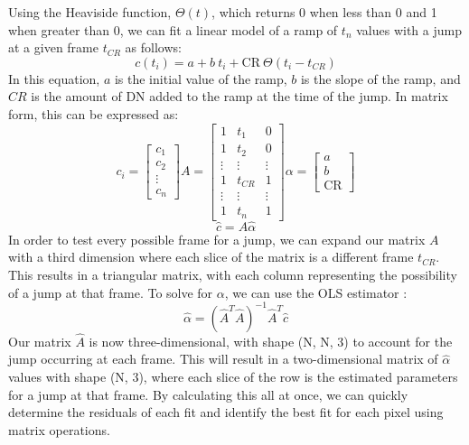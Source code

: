 Using the Heaviside function, $\Theta(t)$, which returns 0 when less than 0 and 1 when greater than 0, we can fit a linear model of a ramp of $t_n$ values with a jump at a given frame $t_{CR}$ as follows:
\begin{equation}
    c(t_i) = a + b\ t_i + \text{CR}\ \Theta(t_i - t_{CR})
\end{equation}
In this equation, $a$ is the initial value of the ramp, $b$ is the slope of the ramp, and $CR$ is the amount of DN added to the ramp at the time of the jump.
In matrix form, this can be expressed as:
\begin{equation}
    c_i = \begin{bmatrix}
        c_1 \\
        c_2 \\
        \vdots \\
        c_n
    \end{bmatrix}
    A = \begin{bmatrix}
        1 & t_1 & 0 \\
        1 & t_2 & 0 \\
        \vdots & \vdots & \vdots \\
        1 & t_{CR} & 1 \\
        \vdots & \vdots & \vdots \\
        1 & t_n & 1
    \end{bmatrix}
    \alpha = \begin{bmatrix}
        a \\ b \\ \text{CR}
    \end{bmatrix}
\end{equation}
\begin{equation}
    \hat{c} = A \hat{\alpha}
\end{equation}
In order to test every possible frame for a jump, we can expand our matrix $A$ with a third dimension where each slice of the matrix is a different frame $t_{CR}$.
This results in a triangular matrix, with each column representing the possibility of a jump at that frame.
To solve for $\alpha$, we can use the OLS estimator \parencite{puntanen1989equality}:
\begin{equation}
    \hat{\alpha} = (\hat{A}^T \hat{A})^{-1} \hat{A}^T \hat{c}
\end{equation}
Our matrix $\hat{A}$ is now three-dimensional, with shape (N, N, 3) to account for the jump occurring at each frame.
This will result in a two-dimensional matrix of $\hat{\alpha}$ values with shape (N, 3), where each slice of the row is the estimated parameters for a jump at that frame.
By calculating this all at once, we can quickly determine the residuals of each fit and identify the best fit for each pixel using matrix operations.


